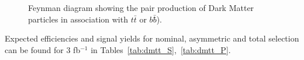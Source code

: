 \begin{figure}[h!]
  \centering
  \caption{Feynman diagram showing the pair production of Dark Matter particles in association with $t\bar{t}$ or $b\bar{b}$̄). \cite{Abercrombie:2015wmb}}
  \label{fig:feynman_hf}
\end{figure}


Expected efficiencies and signal yields for nominal, asymmetric and total selection can be found for 3 fb$^{-1}$ in Tables~\ref{tab:dmtt_S},~\ref{tab:dmtt_P}.

